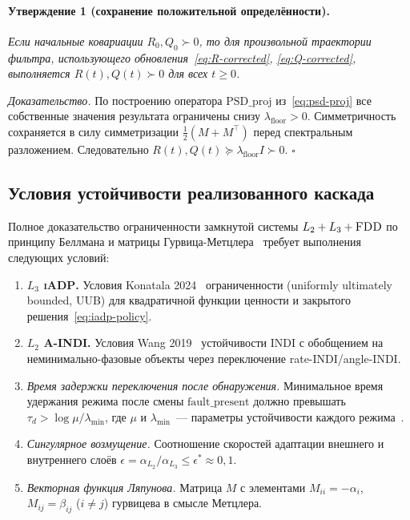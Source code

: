 \documentclass[a4paper,14pt]{extarticle}
\newcommand{\IADP}{\textsc{iADP}}
\newcommand{\AINDI}{\textsc{A-INDI}}
\newcommand{\FDD}{\textsc{FDD}}
\begin{document}
\paragraph{Утверждение 1 (сохранение положительной определённости).} \emph{Если начальные ковариации $R_0, Q_0 \succ 0$, то для произвольной траектории фильтра, использующего обновления~\eqref{eq:R-corrected}, \eqref{eq:Q-corrected}, выполняется $R(t), Q(t) \succ 0$ для всех $t \geq 0$.}

\emph{Доказательство.} По построению оператора $\mathrm{PSD\_proj}$ из~\eqref{eq:psd-proj} все собственные значения результата ограничены снизу $\lambda_{\text{floor}} > 0$. Симметричность сохраняется в силу симметризации $\frac{1}{2}(M+M^\top)$ перед спектральным разложением. Следовательно $R(t), Q(t) \succeq \lambda_{\text{floor}} I \succ 0$. $\square$

\subsection{Условия устойчивости реализованного каскада}

Полное доказательство ограниченности замкнутой системы $L_2 + L_3 + \FDD{}$ по принципу Беллмана и матрицы Гурвица-Метцлера~\cite{khalil2002} требует выполнения следующих условий:
\begin{enumerate}
\item \textbf{$L_3$ \IADP{}.} Условия Konatala 2024~\cite{konatala2024} ограниченности (uniformly ultimately bounded, UUB) для квадратичной функции ценности и закрытого решения~\eqref{eq:iadp-policy}.
\item \textbf{$L_2$ \AINDI{}.} Условия Wang 2019~\cite{wang2019} устойчивости INDI с обобщением на неминимально-фазовые объекты через переключение rate-INDI/angle-INDI.
\item \emph{Время задержки переключения после обнаружения.} Минимальное время удержания режима после смены $\text{fault\_present}$ должно превышать $\tau_d > \log\mu / \lambda_{\min}$, где $\mu$ и $\lambda_{\min}$~--- параметры устойчивости каждого режима~\cite{liberzon2003}.
\item \emph{Сингулярное возмущение.} Соотношение скоростей адаптации внешнего и внутреннего слоёв $\epsilon = \alpha_{L_2} / \alpha_{L_3} \leq \epsilon^* \approx 0{,}1$.
\item \emph{Векторная функция Ляпунова.} Матрица $M$ с элементами $M_{ii} = -\alpha_i$, $M_{ij} = \beta_{ij}$ ($i \neq j$) гурвицева в смысле Метцлера.
\end{enumerate}
\end{document}
